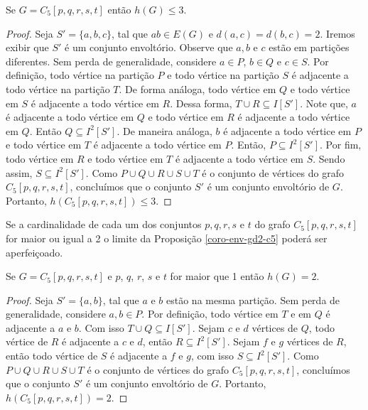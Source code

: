 \begin{proposition}
    Se $G = C_5[p, q, r, s, t]$ então $h(G) \le 3$.
\label{coro-env-gd2-c5}
\end{proposition}
\begin{proof}
Seja $S'=\{a, b, c\}$, tal que $ab \in E(G)$ e $d(a,c)=d(b,c)=2$. Iremos exibir que $S'$ é um conjunto envoltório. Observe que $a, b$ e $c$ estão em partições diferentes. Sem perda de generalidade, considere $a \in P$, $b \in Q$ e $c \in S$. Por definição, todo vértice na partição $P$ e todo vértice na partição $S$ é adjacente a todo vértice na partição $T$. De forma análoga, todo vértice em $Q$ e todo vértice em $S$ é adjacente a todo vértice em $R$. Dessa forma, $T \cup R \subseteq I[S']$. Note que, $a$ é adjacente a todo vértice em $Q$ e todo vértice em $R$ é adjacente a todo vértice em $Q$. Então $Q \subseteq I^2[S']$. De maneira análoga, $b$ é adjacente a todo vértice em $P$ e todo vértice em $T$ é adjacente a todo vértice em $P$. Então, $P \subseteq I^2[S']$. Por fim, todo vértice em $R$ e todo vértice em $T$ é adjacente a todo vértice em $S$. Sendo assim, $S \subseteq I^2[S']$. Como $P\cup Q \cup R \cup S \cup T$ é o conjunto de vértices do grafo $C_5[p, q, r, s, t]$, concluímos que o conjunto $S'$ é um conjunto envoltório de $G$. Portanto, $h(C_5[p, q, r, s, t])\le 3$.
\end{proof}

Se a cardinalidade de cada um dos conjuntos $p, q ,r, s$ e $t$ do grafo $C_5[p,q,r,s,t]$ for maior ou igual a 2 o limite da Proposição \ref{coro-env-gd2-c5} poderá ser aperfeiçoado.

\begin{proposition}
    Se $G = C_5[p, q, r, s, t]$ e $p$, $q$, $r$, $s$ e $t$ for maior que 1 então $h(G) = 2$.
\label{coro-env-gd2-c5-h2}
\end{proposition}
\begin{proof}
Seja $S'=\{a, b\}$, tal que $a$ e $b$ estão na mesma partição. Sem perda de generalidade, considere $a,b \in P$. Por definição, todo vértice em $T$ e em $Q$ é adjacente a $a$ e $b$. Com isso $T \cup Q \subseteq I[S']$. Sejam $c$ e $d$ vértices de $Q$, todo vértice de $R$ é adjacente a $c$ e $d$, então $R \subseteq I^2[S']$. Sejam $f$ e $g$ vértices de $R$, então todo vértice de $S$ é adjacente a $f$ e $g$, com isso $S \subseteq I^2[S']$. Como $P\cup Q \cup R \cup S \cup T$ é o conjunto de vértices do grafo $C_5[p, q, r, s, t]$, concluímos que o conjunto $S'$ é um conjunto envoltório de $G$. Portanto, $h(C_5[p, q, r, s, t])= 2$.
\end{proof}

